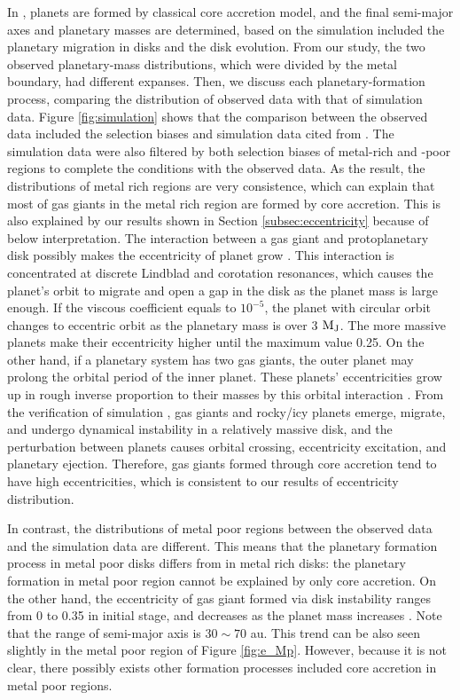 \documentclass[twocolumn, dvipdfmx]{aastex62}
\begin{document}
\begin{CJK*}{UTF8}{min}
In \cite{2012A&A...541A..97M}, planets are formed by classical core accretion model, and the final semi-major axes and planetary masses are determined, based on the simulation included the planetary migration in disks and the disk evolution. From our study, the two observed planetary-mass distributions, which were divided by the metal boundary, had different expanses. Then, we discuss each planetary-formation process, comparing the distribution of observed data with that of simulation data. Figure \ref{fig:simulation} shows that the comparison between the observed data included the selection biases and simulation data cited from \cite{2012A&A...541A..97M}. The simulation data were also filtered by both selection biases of metal-rich and -poor regions to complete the conditions with the observed data. As the result, the distributions of metal rich regions are very consistence, which can explain that most of gas giants in the metal rich region are formed by core accretion. This is also explained by our results shown in Section \ref{subsec:eccentricity} because of below interpretation. The interaction between a gas giant and protoplanetary disk possibly makes the eccentricity of planet grow \citep{2003ApJ...585.1024G, 2006A&A...447..369K}. This interaction is concentrated at discrete Lindblad and corotation resonances, which causes the planet's orbit to migrate and open a gap in the disk as the planet mass is large enough. If the viscous coefficient equals to $10^{-5}$, the planet with circular orbit changes to eccentric orbit as the planetary mass is over 3 $\rm M_J$. The more massive planets make their eccentricity higher until the maximum value 0.25. On the other hand, if a planetary system has two gas giants, the outer planet may prolong the orbital period of the inner planet. These planets' eccentricities grow up in rough inverse proportion to their masses by this orbital interaction \citep{2002ApJ...564L.105C}. From the verification of simulation \citep{2013ApJ...775...42I}, gas giants and rocky/icy planets emerge, migrate, and undergo dynamical instability in a relatively massive disk, and the perturbation between planets causes orbital crossing, eccentricity excitation, and planetary ejection. Therefore, gas giants formed through core accretion tend to have high eccentricities, which is consistent to our results of eccentricity distribution.

In contrast, the distributions of metal poor regions between the observed data and the simulation data are different. This means that the planetary formation process in metal poor disks differs from in metal rich disks: the planetary formation in metal poor region cannot be explained by only core accretion. On the other hand, the eccentricity of gas giant formed via disk instability ranges from 0 to 0.35 in initial stage, and decreases as the planet mass increases \citep{2011ApJ...731...74B}. Note that the range of semi-major axis is $30\sim70$ au. This trend can be also seen slightly in the metal poor region of Figure \ref{fig:e_Mp}. However, because it is not clear, there possibly exists other formation processes included core accretion in metal poor regions.


\end{CJK*}
\end{document}
